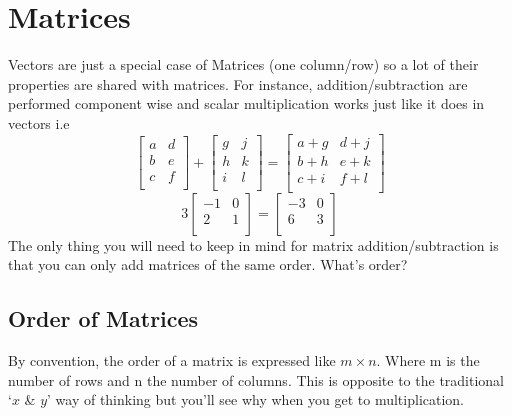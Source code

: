 \documentclass[12pt] {article}
\begin{document}
\section{Matrices}
Vectors are just a special case of Matrices (one column/row) so a lot of their properties
are shared with matrices. For instance, addition/subtraction are performed component wise 
and scalar multiplication works just like it does in vectors i.e
\begin{equation*}
  \begin{bmatrix}
    a & d \\
    b & e \\
    c & f \\
  \end{bmatrix}
  + 
  \begin{bmatrix}
    g & j \\
    h & k \\
    i & l \\
  \end{bmatrix}
  =
  \begin{bmatrix}
    a+g & d+j \\
    b+h & e+k \\
    c+i & f+l \\
  \end{bmatrix}
\end{equation*}
\begin{equation*}
  3
  \begin{bmatrix}
    -1 & 0 \\
    2 & 1 \\
  \end{bmatrix}
  =
  \begin{bmatrix}
    -3 & 0 \\
    6 & 3 \\
  \end{bmatrix}
\end{equation*}
The only thing you will need to keep in mind for matrix addition/subtraction is 
that you can only add matrices of the same order. What's order?

\subsection*{Order of Matrices}
By convention, the order of a matrix is expressed like $m \times n$. Where m is the number
of rows and n the number of columns. This is opposite to the traditional `$x$ \& $y$' way
of thinking but you'll see why when you get to multiplication.
\end{document}
